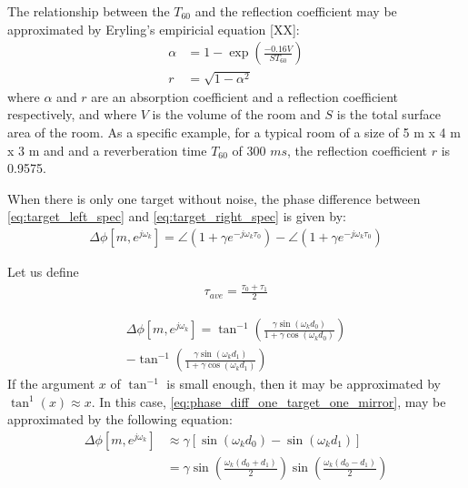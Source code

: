 \documentclass[journal]{IEEEtran}
\begin{document}
The relationship between the $T_{60}$ and the reflection coefficient may
be approximated by Eryling's empiricial equation [XX]:
\begin{align}
  \alpha & = 1 - \exp \left(\frac{- 0.16 V}{S T_{60}}  \right) \\
  r & = \sqrt{1 - \alpha^2}
\end{align}
where $\alpha$ and $r$ are an absorption coefficient and a reflection coefficient
respectively, and where $V$ is the volume of the room and $S$ is the total
surface area of the room.  As a specific example, for a typical room of a size 
of 5 m x 4 m x 3 m and and a reverberation time $T_{60}$ of 300 $ms$, the reflection
coefficient $r$ is 0.9575.

When there is only one target without noise, the phase difference between
\eqref{eq:target_left_spec} and \eqref{eq:target_right_spec} is given by:
%
%
\begin{align}
  \Delta \phi[m, e^{j \omega_k}] = \angle \left( 1  + \gamma e^{-j \omega_k \tau_0}\right)
    - \angle \left( 1  + \gamma e^{-j \omega_k \tau_0}\right)
\end{align}
%

Let us define 
\begin{align}
  \tau_{ave} = \frac{\tau_0 + \tau_1}{2}
\end{align}

\begin{align}
  \Delta \phi[m, e^{j \omega_k}] 
        = \tan^{-1}\left( \frac{\gamma \sin \left(\omega_k d_0 \right)}
        {1 + \gamma \cos \left( \omega_k d_0 \right)} \right) \nonumber  \\
        - \tan^{-1}\left( \frac{\gamma \sin \left(\omega_k d_1 \right)}
        {1 + \gamma \cos \left( \omega_k d_1 \right)} \right) 
          \label{eq:phase_diff_one_target_one_mirror}
\end{align}
If the argument $x$ of $\tan^{-1}$ is small enough, then it may be approximated 
by $\tan^{1}(x) \approx x$. In this case, \eqref{eq:phase_diff_one_target_one_mirror},
may be approximated by the following equation:
\begin{align}
  \Delta \phi[m, e^{j \omega_k}] & \approx 
    \gamma \left[ \sin \left(\omega_k d_0 \right) 
    - \sin \left(\omega_k d_1 \right) \right]  \nonumber \\
        & = \gamma \sin \left(\frac{\omega_k \left(d_0 + d_1 \right) }{2}  \right)
    \sin \left( \frac{ \omega_k \left(d_0 - d_1 \right) }{2} \right)
      \label{eq:approx_phase_diff_one_target_one_mirror}
\end{align}
\end{document}

